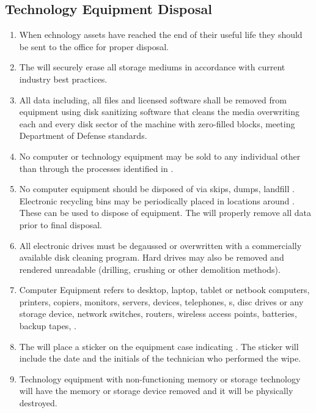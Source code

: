 \subsection{Technology Equipment Disposal}
\begin{enumerate}
\item
When echnology assets have reached the end of their useful life they should be sent to the \EquipmentDisposalTeam{} office for proper disposal.
\item
The \EquipmentDisposalTeam{} will securely erase all storage mediums in accordance with current industry best practices.
\item
All data including, all files and licensed software shall be removed from equipment using disk sanitizing software that cleans the media overwriting each and every disk sector of the machine with zero-filled blocks, meeting Department of Defense standards.
\item
No computer or technology equipment may be sold to any individual other than through the processes identified in .
\item
No computer equipment should be disposed of via skips, dumps, landfill\ins{,} \etc.  
Electronic recycling bins may be periodically placed in locations around \CompanyName{}.  
These can be used to dispose of equipment.  
The \EquipmentDisposalTeam will properly remove all data prior to final disposal. 
\item
All electronic drives must be degaussed or overwritten with a commercially available disk cleaning program.  
Hard drives may also be removed and rendered unreadable (drilling, crushing\oxford{} or other demolition methods).
\item
Computer Equipment refers to desktop, laptop, tablet or netbook computers, printers, copiers, monitors, servers, \handheld{} devices, telephones, \cellphone{}s, disc drives or any storage device, network switches, routers, wireless access points, batteries, backup tapes, \etc.
\item
The \EquipmentDisposalTeam will place a sticker on the equipment case indicating .  
The sticker will include the date and the initials of the technician who performed the  wipe.
\item
Technology equipment with non-functioning memory or storage technology will have the memory or storage device removed and it will be physically destroyed.
\end{enumerate}
